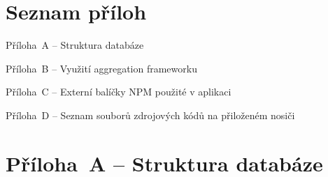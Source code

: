 \documentclass[a4paper,12pt]{article}
\begin{document}


\clearpage {} {}
\section*{Seznam příloh}

\noindent Příloha~A -- Struktura databáze \dotfill \pageref{prilohaA}

\noindent Příloha~B -- Využití aggregation frameworku \dotfill \pageref{prilohaB}

\noindent Příloha~C -- Externí balíčky NPM použité v aplikaci \dotfill \pageref{prilohaC}

\noindent Příloha~D -- Seznam souborů zdrojových kódů na přiloženém nosiči \dotfill \pageref{prilohaD}

\clearpage {}\label{prilohaA} 

\section*{Příloha~A --  Struktura databáze}
\end{document}
